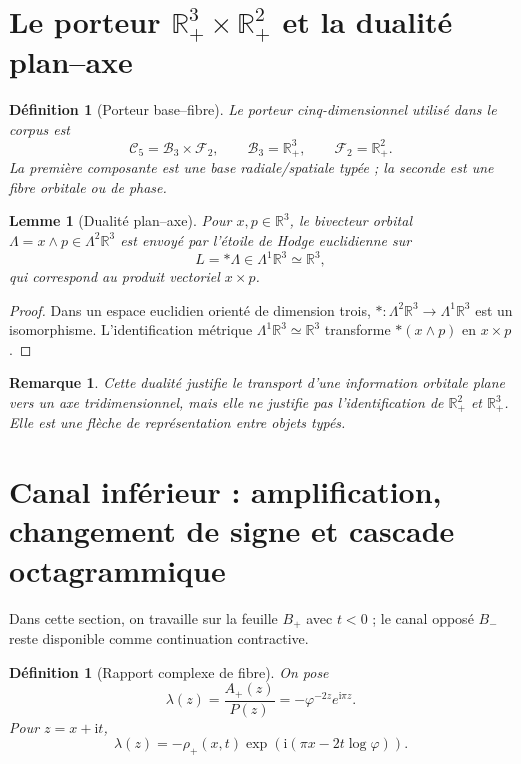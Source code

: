 \documentclass[11pt,a4paper]{article}
\newtheorem{lemma}[theorem]{Lemme}
\newtheorem{definition}[theorem]{Définition}
\newtheorem{remark}[theorem]{Remarque}
\newcommand{\R}{\mathbb R}
\newcommand{\Rp}{\mathbb R_{+}}
\newcommand{\ii}{\mathrm i}
\newcommand{\ph}{\varphi}
\begin{document}
\section{Le porteur $\Rp^3\times\Rp^2$ et la dualité plan--axe}

\begin{definition}[Porteur base--fibre]
Le porteur cinq-dimensionnel utilisé dans le corpus est
\[
 \mathcal C_5=\mathcal B_3\times\mathcal F_2,
 \qquad
 \mathcal B_3=\Rp^3,
 \qquad
 \mathcal F_2=\Rp^2.
\]
La première composante est une base radiale/spatiale typée ; la seconde est une fibre orbitale ou de phase.
\end{definition}

\begin{lemma}[Dualité plan--axe]
Pour $x,p\in\R^3$, le bivecteur orbital $\Lambda=x\wedge p\in\Lambda^2\R^3$ est envoyé par l'étoile de Hodge euclidienne sur
\[
 L=*\Lambda\in\Lambda^1\R^3\simeq\R^3,
\]
qui correspond au produit vectoriel $x\times p$.
\end{lemma}

\begin{proof}
Dans un espace euclidien orienté de dimension trois, $*: \Lambda^2\R^3\to\Lambda^1\R^3$ est un isomorphisme. L'identification métrique $\Lambda^1\R^3\simeq\R^3$ transforme $*(x\wedge p)$ en $x\times p$.
\end{proof}

\begin{remark}
Cette dualité justifie le transport d'une information orbitale plane vers un axe tridimensionnel, mais elle ne justifie pas l'identification de $\Rp^2$ et $\Rp^3$. Elle est une flèche de représentation entre objets typés.
\end{remark}

\section{Canal inférieur : amplification, changement de signe et cascade octagrammique}

Dans cette section, on travaille sur la feuille $B_+$ avec $t<0$ ; le canal opposé $B_-$ reste disponible comme continuation contractive.

\begin{definition}[Rapport complexe de fibre]
On pose
\[
 \lambda(z)=\frac{A_+(z)}{P(z)}=-\ph^{-2z}e^{\ii\pi z}.
\]
Pour $z=x+\ii t$,
\begin{equation}\label{eq:lambda-polar}
 \lambda(z)=-\rho_+(x,t)\exp\!\left(\ii(\pi x-2t\log\ph)\right).
\end{equation}
\end{definition}
\end{document}
